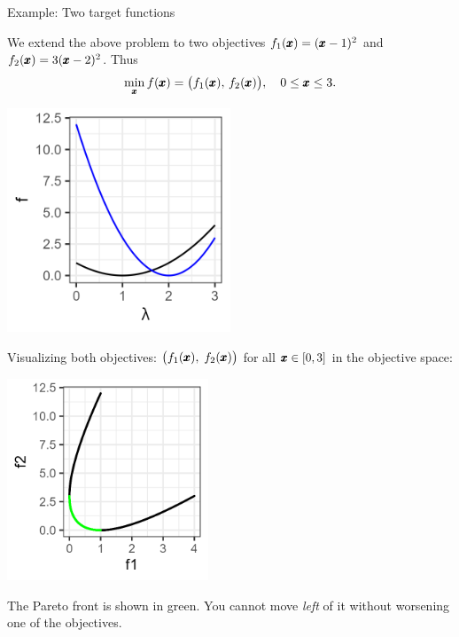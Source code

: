 \documentclass[11pt,compress,t,notes=noshow,xcolor=table]{beamer}
\begin{document}
\begin{vbframe}{Example: Two target functions}

We extend the above problem to two objectives 
\(f_1(\pmb{x}) = (\pmb{x} - 1)^2\) 
and 
\(f_2(\pmb{x}) = 3(\pmb{x} - 2)^2\). Thus
\[
  \min_{\pmb{x}} f(\pmb{x}) 
    = \bigl(f_1(\pmb{x}),\, f_2(\pmb{x})\bigr),
  \quad 0 \le \pmb{x} \le 3.
\]

\begin{center}
\includegraphics[width=0.5\textwidth]{slides/11-multicrit/figure_man/graph2.png}
\end{center}

\framebreak

Visualizing both objectives:
$\bigl(f_1(\pmb{x}), \;f_2(\pmb{x})\bigr)
$
for all \(\pmb{x} \in [0,3]\) in the objective space:

\begin{center}
\includegraphics[width=0.45\textwidth]{slides/11-multicrit/figure_man/graph3.png}
\end{center}

The Pareto front is shown in green. You cannot move \emph{left} of it without 
worsening one of the objectives.

\end{vbframe}
\end{document}
